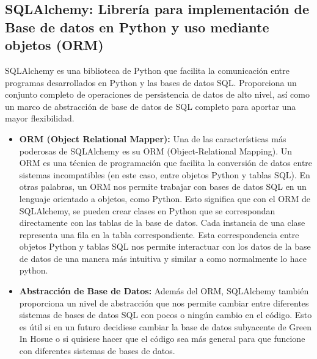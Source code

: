    \subsection{SQLAlchemy: Librería para implementación de Base de datos en Python y uso mediante objetos (ORM)}
    SQLAlchemy es una biblioteca de Python que facilita la comunicación entre programas desarrollados en Python y las bases de datos SQL. Proporciona un conjunto completo de operaciones de persistencia de datos de alto nivel, así como un marco de abstracción de base de datos de SQL completo para aportar una mayor flexibilidad. 
    \begin{itemize}
        \item \textbf{ORM (Object Relational Mapper):} Una de las características más poderosas de SQLAlchemy es su ORM (Object-Relational Mapping). Un ORM es una técnica de programación que facilita la conversión de datos entre sistemas incompatibles (en este caso, entre objetos Python y tablas SQL). En otras palabras, un ORM nos permite trabajar con bases de datos SQL en un lenguaje orientado a objetos, como Python. Esto significa que con el ORM de SQLAlchemy, se pueden crear clases en Python que se correspondan directamente con las tablas de la base de datos. Cada instancia de una clase representa una fila en la tabla correspondiente. Esta correspondencia entre objetos Python y tablas SQL nos permite interactuar con los datos de la base de datos de una manera más intuitiva y similar a como normalmente lo hace python.
        \item \textbf{Abstracción de Base de Datos:} Además del ORM, SQLAlchemy también proporciona un nivel de abstracción que nos permite cambiar entre diferentes sistemas de bases de datos SQL con pocos o ningún cambio en el código. Esto es útil si en un futuro decidiese cambiar la base de datos subyacente de Green In Hosue o si quisiese hacer que el código sea más general para que funcione con diferentes sistemas de bases de datos.
    \end{itemize}
